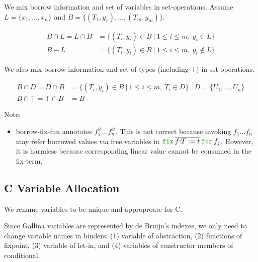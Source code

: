 \documentclass[a4paper,fleqn]{article}
\def\gallina{\textrm{Gallina}}
\newcommand{\kwfix}{\mbox{\color{mygreen}\ttfamily fix}}
\newcommand{\kwfor}{\mbox{\color{mygreen}\ttfamily for}}
\newcommand{\ofix}[2]{\kwfix\:{#1}\:\kwfor\:{#2}}
\newcommand{\rep}[1]{\overline{#1}}
\begin{document}
We mix borrow information and set of variables in set-operations.
Assume $L=\{x_1,\ldots,x_n\}$ and $B=\{(T_1,y_1),\ldots,(T_m,y_m)\}$.

\begin{align*}
  B \cap L = L \cap B &= \{(T_i,y_i) \in B ~|~ 1\leq i\leq m,~ y_i \in L \} \\
  B - L &= \{(T_i,y_i) \in B ~|~ 1\leq i\leq m,~ y_i \not\in L \}
\end{align*}

We also mix borrow information and set of types (including $\top$) in set-operations.

\begin{align*}
  B \cap D = D \cap B &= \{(T_i,y_i) \in B ~|~ 1\leq i\leq m,~ T_i \in D \} & D = \{U_1, \ldots, U_n\} \\
  B \cap \top = \top \cap B &= B
\end{align*}

{\small Note:
\begin{itemize}
  \item borrow-fix-fun annotates $f_1^\varnothing \ldots f_n^\varnothing$.
    This is not correct because invoking $f_1\ldots f_n$ may refer borrowed values via free variables in
    $\ofix{\rep{f{:}T:=t}}{f_j}$.
    However, it is harmless because corresponding linear value cannot be consumed in the fix-term.
\end{itemize}}

\subsection{C Variable Allocation}\label{sec:cvaralloc}

We rename variables to be unique and approproate for C.

Since \gallina{} variables are represented by de Bruijn's indexes,
we only need to change variable names in binders:
(1) variable of abstraction,
(2) functions of fixpoint,
(3) variable of let-in, and
(4) variables of constructor members of conditional.
\end{document}

